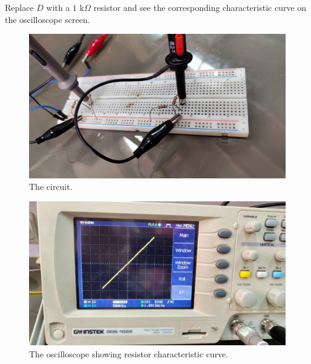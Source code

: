 \documentclass[11pt]{article}
\newcommand{\PicScale}{0.2}
\begin{document}
\begin{question}
\begin{subquestion}{Replace $D$ with a $1$ k$\Omega$ resistor and see the corresponding characteristic curve on the oscilloscope screen.}
{            \begin{figure}[H]
                \centering
                \includegraphics[scale=\PicScale,angle=0]{Fig/40.jpeg}
                \caption{The circuit.}
            \end{figure}
            \begin{figure}[H]
                \centering
                \includegraphics[scale=\PicScale,angle=0]{Fig/41.jpeg}
                \caption{The oscilloscope showing resistor characteristic curve.}
            \end{figure}
        }
    \end{subquestion}


\end{question}
\end{document}
